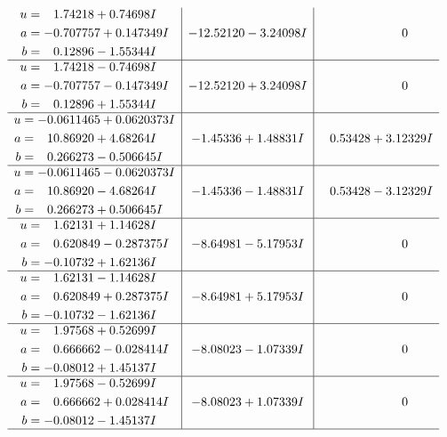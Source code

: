 \documentclass[1p]{elsarticle_modified}
\theoremstyle{definition}
\begin{document}
$$\begin{array}{c|c|c}
\begin{aligned}
u &= \phantom{-}1.74218 + 0.74698 I \\
a &= -0.707757 + 0.147349 I \\
b &= \phantom{-}0.12896 - 1.55344 I\end{aligned}
 & -12.52120 - 3.24098 I & \phantom{-0.000000 } 0 \\ \hline\begin{aligned}
u &= \phantom{-}1.74218 - 0.74698 I \\
a &= -0.707757 - 0.147349 I \\
b &= \phantom{-}0.12896 + 1.55344 I\end{aligned}
 & -12.52120 + 3.24098 I & \phantom{-0.000000 } 0 \\ \hline\begin{aligned}
u &= -0.0611465 + 0.0620373 I \\
a &= \phantom{-}10.86920 + 4.68264 I \\
b &= \phantom{-}0.266273 - 0.506645 I\end{aligned}
 & -1.45336 + 1.48831 I & \phantom{-}0.53428 + 3.12329 I \\ \hline\begin{aligned}
u &= -0.0611465 - 0.0620373 I \\
a &= \phantom{-}10.86920 - 4.68264 I \\
b &= \phantom{-}0.266273 + 0.506645 I\end{aligned}
 & -1.45336 - 1.48831 I & \phantom{-}0.53428 - 3.12329 I \\ \hline\begin{aligned}
u &= \phantom{-}1.62131 + 1.14628 I \\
a &= \phantom{-}0.620849 - 0.287375 I \\
b &= -0.10732 + 1.62136 I\end{aligned}
 & -8.64981 - 5.17953 I & \phantom{-0.000000 } 0 \\ \hline\begin{aligned}
u &= \phantom{-}1.62131 - 1.14628 I \\
a &= \phantom{-}0.620849 + 0.287375 I \\
b &= -0.10732 - 1.62136 I\end{aligned}
 & -8.64981 + 5.17953 I & \phantom{-0.000000 } 0 \\ \hline\begin{aligned}
u &= \phantom{-}1.97568 + 0.52699 I \\
a &= \phantom{-}0.666662 - 0.028414 I \\
b &= -0.08012 + 1.45137 I\end{aligned}
 & -8.08023 - 1.07339 I & \phantom{-0.000000 } 0 \\ \hline\begin{aligned}
u &= \phantom{-}1.97568 - 0.52699 I \\
a &= \phantom{-}0.666662 + 0.028414 I \\
b &= -0.08012 - 1.45137 I\end{aligned}
 & -8.08023 + 1.07339 I & \phantom{-0.000000 } 0\\
 \hline 
 \end{array}$$\newpage\newpage\renewcommand{\arraystretch}{1}
\end{document}
